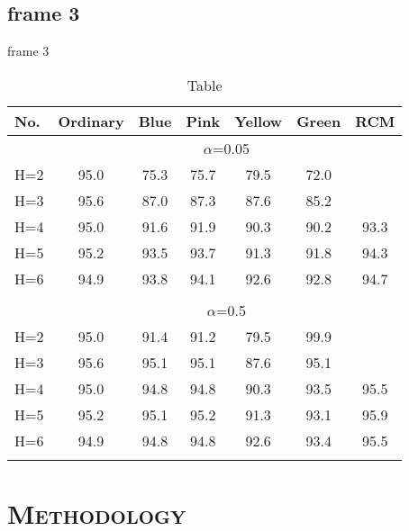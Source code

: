 \documentclass[xcolor=x11names,compress,8pt]{beamer}
\renewcommand{\(}{\begin{columns}}
\renewcommand{\)}{\end{columns}}
\newcommand{\<}[1]{\begin{column}{#1}}
\renewcommand{\>}{\end{column}}
\begin{document}
\subsection{frame 3}
\begin{frame}{frame 3}

\begin{table}
\caption{Table}
\begin{tabular}{l c c c c c c}
\hline \hline
No.  & {Ordinary} & {Blue} & {Pink} & {Yellow} & {Green} & {RCM}\\
\hline
\only<1,3>{
&\multicolumn{6}{c}{$\alpha$=0.05}\\
H=2     &     95.0 &    75.3    &   75.7    &   79.5    &   72.0    &\\
H=3 & 95.6 &    87.0    &   87.3    &   87.6    &   85.2    & \\
H=4 & 95.0 &    91.6    &   91.9    &   90.3    &   90.2    & 93.3\\
H=5 & 95.2 &    93.5    &   93.7    &   91.3    &   91.8    & 94.3\\
H=6 & 94.9 &    93.8    &   94.1    &   92.6    &   92.8    & 94.7 \\[-\normalbaselineskip]
}\only<3>{\\}
\only<2,3>{
&\multicolumn{6}{c}{$\alpha$=0.5}\\
H=2 & 95.0  &   91.4    &   91.2    &   79.5    &   99.9    &   \\
H=3 & 95.6  &   95.1    &   95.1    &   87.6    &   95.1    &   \\
H=4 & 95.0  &   94.8    &   94.8    &   90.3    &   93.5    & 95.5  \\
H=5 & 95.2  &   95.1    &   95.2    &   91.3    &   93.1    & 95.9  \\
H=6 & 94.9  &   94.8    &   94.8    &   92.6    &   93.4    & 95.5 \\[-\normalbaselineskip]
}
\\\hline
\end{tabular}
\end{table}


\end{frame}

\section{\scshape Methodology}
\end{document}
